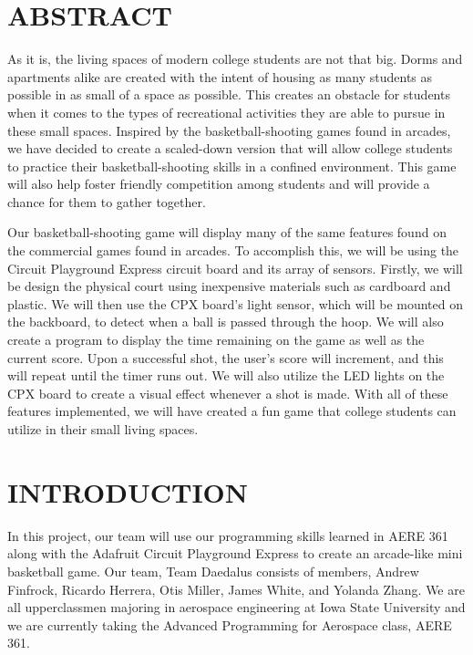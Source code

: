 \documentclass[12pt]{article}
\begin{document}
\tableofcontents
\pagebreak

\section{ABSTRACT}
As it is, the living spaces of modern college students are not that big. Dorms and apartments alike are created with the intent of housing as many students as possible in as small of a space as possible. This creates an obstacle for students when it comes to the types of recreational activities they are able to pursue in these small spaces. Inspired by the basketball-shooting games found in arcades, we have decided to create a scaled-down version that will allow college students to practice their basketball-shooting skills in a confined environment. This game will also help foster friendly competition among students and will provide a chance for them to gather together. 

Our basketball-shooting game will display many of the same features found on the commercial games found in arcades. To accomplish this, we will be using the Circuit Playground Express circuit board and its array of sensors. Firstly, we will be design the physical court using inexpensive materials such as cardboard and plastic. We will then use the CPX board's light sensor, which will be mounted on the backboard, to detect when a ball is passed through the hoop. We will also create a program to display the time remaining on the game as well as the current score. Upon a successful shot, the user's score will increment, and this will repeat until the timer runs out. We will also utilize the LED lights on the CPX board to create a visual effect whenever a shot is made. With all of these features implemented, we will have created a fun game that college students can utilize in their small living spaces.

\section{INTRODUCTION}
In this project, our team will use our programming skills learned in AERE 361 along with the Adafruit Circuit Playground Express to create an arcade-like mini basketball game. Our team, Team Daedalus consists of members, Andrew Finfrock, Ricardo Herrera, Otis Miller, James White, and Yolanda Zhang. We are all upperclassmen majoring in aerospace engineering at Iowa State University and we are currently taking the Advanced Programming for Aerospace class, AERE 361. 
\end{document}
